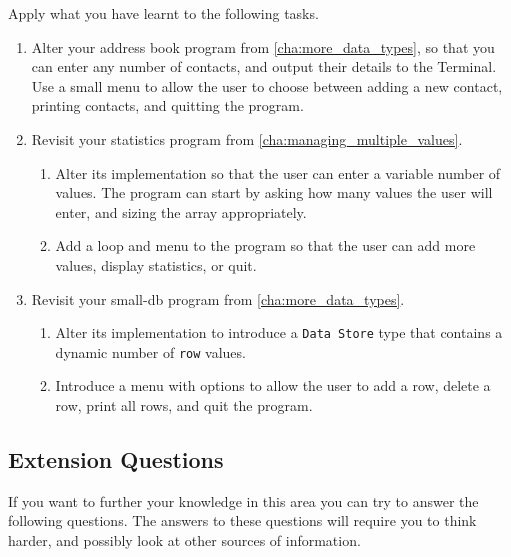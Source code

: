 Apply what you have learnt to the following tasks.

\begin{enumerate}
  \item Alter your address book program from \cref{cha:more_data_types}, so that you can enter any number of contacts, and output their details to the Terminal. Use a small menu to allow the user to choose between adding a new contact, printing contacts, and quitting the program.
  
  \item Revisit your statistics program from \cref{cha:managing_multiple_values}.
  \begin{enumerate}
    \item Alter its implementation so that the user can enter a variable number of values. The program can start by asking how many values the user will enter, and sizing the array appropriately.
    \item Add a loop and menu to the program so that the user can add more values, display statistics, or quit.
  \end{enumerate} 
  \item Revisit your small-db program from \cref{cha:more_data_types}.
  \begin{enumerate}
    \item Alter its implementation to introduce a \texttt{Data Store} type that contains a dynamic number of \texttt{row} values.
    \item Introduce a menu with options to allow the user to add a row, delete a row, print all rows, and quit the program.
  \end{enumerate}
\end{enumerate}


\subsection{Extension Questions} %
\label{sub:dynamic_memory_extension_questions}

If you want to further your knowledge in this area you can try to answer the following questions. The answers to these questions will require you to think harder, and possibly look at other sources of information.

